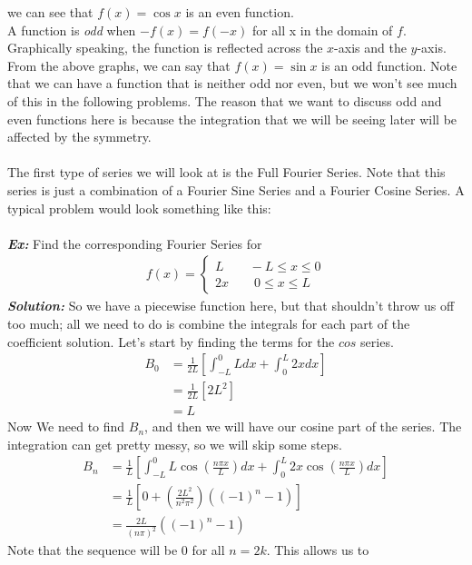 we can see that $f(x) = \cos{x}$ is an even function.\\
\indent A function is \textit{odd} when $-f(x) = f(-x)$ for all x in the domain
of $f$. Graphically speaking, the function is reflected across the $x$-axis and
the $y$-axis. From the above graphs, we can say that $f(x) = \sin{x}$ is an odd
function. Note that we can have a function that is neither odd nor even, but we
won't see much of this in the following problems. The reason that we want to
discuss odd and even functions here is because the integration that we will be
seeing later will be affected by the symmetry.\\\\
\indent The first type of series we will look at is the Full Fourier Series.
Note that this series is just a combination of a Fourier Sine Series and a
Fourier Cosine Series. A typical problem would look something like this:\\\\
\textbf{\textit{Ex:}} Find the corresponding Fourier Series for
\begin{gather*}
f(x)=
\begin{cases*}
L \qquad -L \leq x \leq 0\\
2x \qquad 0 \leq x \leq L
\end{cases*}
\end{gather*}
\indent \textbf{\textit{Solution:}} So we have a piecewise function here, but
that shouldn't throw us off too much; all we need to do is combine the integrals
for each part of the coefficient solution. Let's start by finding the terms for
the $cos$ series.
\begin{align*}
B_{0} &= \frac{1}{2L}\left[\int_{-L}^{0}Ldx + \int_{0}^{L}2xdx\right]\\
&= \frac{1}{2L}[2L^{2}]\\
&= L
\end{align*}
\noindent Now We need to find $B_{n}$, and then we will have our cosine part of
the series. The integration can get pretty messy, so we will skip some steps.
\begin{align*}
B_{n} &= \frac{1}{L}\left[\int_{-L}^{0}L\cos{\left(\frac{n\pi x}{L}\right)}dx + \int_{0}^{L}2x\cos{\left(\frac{n\pi x}{L}\right)}dx\right]\\
&= \frac{1}{L}\left[0 + \left(\frac{2L^{2}}{n^{2}\pi^{2}}\right)((-1)^{n} - 1)\right]\\
&= \frac{2L}{(n\pi)^{2}}((-1)^{n} - 1)
\end{align*}
\noindent Note that the sequence will be 0 for all $n = 2k$. This allows us to
